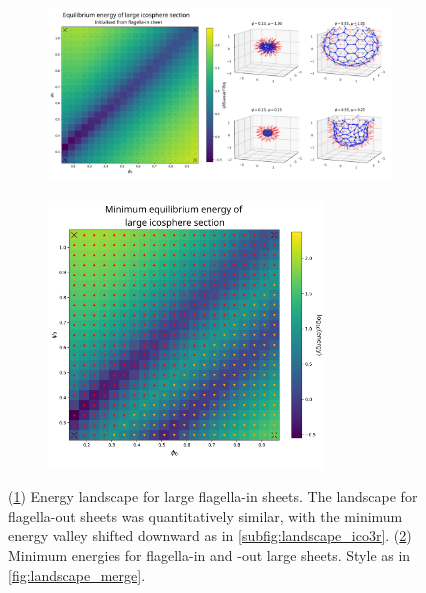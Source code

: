 \begin{figure}
	\centering
	\begin{subfigure}[b]{\textwidth}
		\centering
		\includegraphics[width=\textwidth]{landscape_ico4.png}
		\caption{}
		\label{subfig:landscape_ico4}
	\end{subfigure}
	\begin{subfigure}[b]{\textwidth}
		\centering
		\includegraphics[width=0.8\textwidth]{landscape_ico4ico4r_merge.png}
		\caption{}
		\label{subfig:landscape4_merge}
	\end{subfigure}
	\caption[Energy landscape for flagella-in and flagella-out curved sheets]{(\ref{subfig:landscape_ico4}) Energy landscape for large flagella-in sheets. The landscape for flagella-out sheets was quantitatively similar, with the minimum energy valley shifted downward as in \cref{subfig:landscape_ico3r}. (\ref{subfig:landscape4_merge}) Minimum energies for flagella-in and -out large sheets. Style as in \cref{fig:landscape_merge}.}
	\label{fig:landscape_ico4}
\end{figure}

